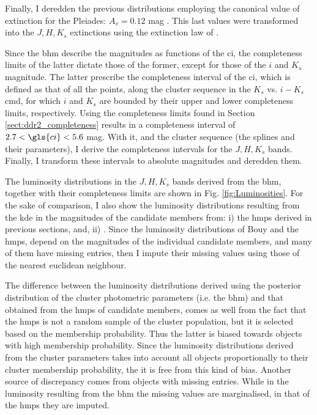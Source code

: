 Finally, I deredden the previous distributions employing the canonical value of extinction for the Pleiades: $A_v=0.12$ mag \citep{Guthrie1987}. This last values were transformed into the $J,H,K_s$ extinctions using the extinction law of \citet{Cardelli1989}.

Since the \gls{bhm} describe the magnitudes as functions of the \gls{ci}, the completeness limits of the latter dictate those of the former, except for those of the $i$ and $K_s$ magnitude. The latter prescribe the completeness interval of the \gls{ci}, which is defined as that of all the points, along the cluster sequence in the $K_s$ vs. $i-K_s$ \gls{cmd}, for which $i$ and $K_s$ are bounded by their upper and lower completeness limits, respectively. Using the completeness limits found in Section \ref{sect:ddr2_completeness} results in a completeness interval of  $2.7<\gls{ci}<5.6$ mag. With it, and the cluster sequence (the splines and their parameters), I derive the completeness intervals for the $J,H,K_s$ bands. Finally, I transform these intervals to absolute magnitudes and deredden them. 

The luminosity distributions in the $J,H,K_s$ bands derived from the \gls{bhm}, together with their completeness limits are shown in Fig. \ref{fig:Luminosities}. For the sake of comparison, I also show the luminosity distributions resulting from the \gls{kde} in the magnitudes of the candidate members from: i) the \gls{hmps} derived in previous sections, and, ii)  \citet{Bouy2015}. Since the  luminosity distributions of Bouy and the \gls{hmps}, depend on the magnitudes of the individual candidate members, and many of them have missing entries, then I impute their missing values using those of the nearest euclidean neighbour. 

The difference between the luminosity distributions derived using the posterior distribution of the cluster photometric parameters (i.e. the \gls{bhm}) and that obtained from the \gls{hmps} of candidate members, comes as well from the fact that the \gls{hmps} is not a random sample of the cluster population, but it is selected based on the membership probability. Thus the latter is biased towards objects with high membership probability. Since the luminosity distributions derived from the cluster parameters takes into account all objects proportionally to their cluster membership probability, the it is free from this kind of bias. Another source of discrepancy comes from objects with missing entries. While in the luminosity resulting from the \gls{bhm} the missing values are marginalised, in that of the \gls{hmps} they are imputed.
 

